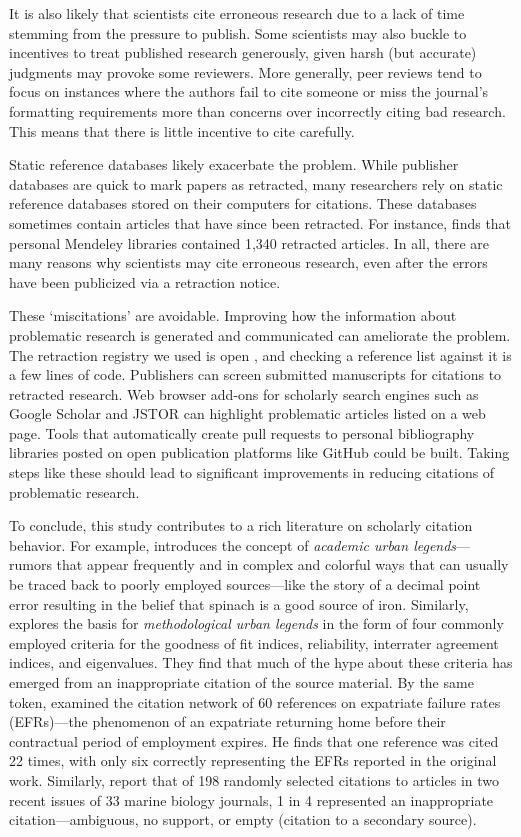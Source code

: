 \documentclass[11pt,letterpaper]{article}
\begin{document}
It is also likely that scientists cite erroneous research due to a lack of time stemming from the pressure to publish. Some scientists may also buckle to incentives to treat published research generously, given harsh (but accurate) judgments may provoke some reviewers. More generally, peer reviews tend to focus on instances where the authors fail to cite someone or miss the journal's formatting requirements more than concerns over incorrectly citing bad research. This means that there is little incentive to cite carefully.

Static reference databases likely exacerbate the problem. While publisher databases are quick to mark papers as retracted, many researchers rely on static reference databases stored on their computers for citations. These databases sometimes contain articles that have since been retracted. For instance, \citet{davis2012persistence} finds that personal Mendeley libraries contained 1,340 retracted articles. In all, there are many reasons why scientists may cite erroneous research, even after the errors have been publicized via a retraction notice.

These `miscitations' are avoidable. Improving how the information about problematic research is generated and communicated can ameliorate the problem. The retraction registry we used is open \citep{retractionwatch2026}, and checking a reference list against it is a few lines of code. Publishers can screen submitted manuscripts for citations to retracted research. Web browser add-ons for scholarly search engines such as Google Scholar and JSTOR can highlight problematic articles listed on a web page. Tools that automatically create pull requests to personal bibliography libraries posted on open publication platforms like GitHub could be built. Taking steps like these should lead to significant improvements in reducing citations of problematic research.

To conclude, this study contributes to a rich literature on scholarly citation behavior. For example, \citet{rekdal2014academic} introduces the concept of \textit{academic urban legends}---rumors that appear frequently and in complex and colorful ways that can usually be traced back to poorly employed sources---like the story of a decimal point error resulting in the belief that spinach is a good source of iron. Similarly, \citet{lance2006sources} explores the basis for \textit{methodological urban legends} in the form of four commonly employed criteria for the goodness of fit indices, reliability, interrater agreement indices, and eigenvalues. They find that much of the hype about these criteria has emerged from an inappropriate citation of the source material. By the same token, \citet{harzing2002our} examined the citation network of 60 references on expatriate failure rates (EFRs)---the phenomenon of an expatriate returning home before their contractual period of employment expires. He finds that one reference was cited 22 times, with only six correctly representing the EFRs reported in the original work. Similarly, \citet{todd2010one} report that of 198 randomly selected citations to articles in two recent issues of 33 marine biology journals, 1 in 4 represented an inappropriate citation---ambiguous, no support, or empty (citation to a secondary source).
\end{document}

